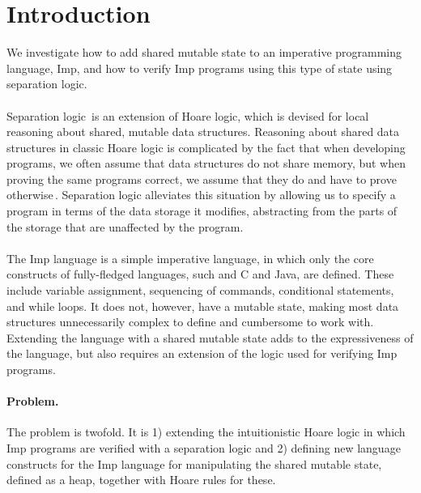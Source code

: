 \section{Introduction}
We investigate how to add shared mutable state to an imperative programming language, Imp, and how to verify Imp programs using this type of state using separation logic.
\paragraph{}
Separation logic\,\cite{Reynolds02} is an extension of Hoare logic, which is devised for local reasoning about shared, mutable data structures. Reasoning about shared data structures in classic Hoare logic is complicated by the fact that when developing programs, we often assume that data structures do not share memory, but when proving the same programs correct, we assume that they do and have to prove otherwise\,\cite{reynolds2008AnIntroductionTo}. Separation logic alleviates this situation by allowing us to specify a program in terms of the data storage it modifies, abstracting from the parts of the storage that are unaffected by the program. 
\paragraph{}
The Imp language is a simple imperative language, in which only the core constructs of fully-fledged languages, such and C and Java, are defined. These include variable assignment, sequencing of commands, conditional statements, and while loops. It does not, however, have a mutable state, making most data structures unnecessarily complex to define and cumbersome to work with. Extending the language with a shared mutable state adds to the expressiveness of the language, but also requires an extension of the logic used for verifying Imp programs.

\paragraph{Problem.}
The problem is twofold. It is 1) extending the intuitionistic Hoare logic in which Imp programs are verified with a separation logic and 2) defining new language constructs for the Imp language for manipulating the shared mutable state, defined as a heap, together with Hoare rules for these.



